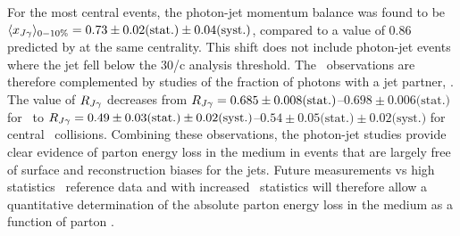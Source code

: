 For the most central events, the  photon-jet momentum balance  was found to be
$\langle x_{J\gamma}\rangle_{0-10\%} = 0.73 \pm 0.02 \mbox{(stat.)} \pm 0.04 \mbox{(syst.)}$, compared
to a value of 0.86 predicted by \PYTHYD{} at the same centrality. This shift does
not include photon-jet events where the jet fell below the 30\GeV/c analysis threshold. 
The \xjg\ observations are therefore complemented by studies of the fraction of 
photons with a jet partner, \rjg.  The value of $R_{J\gamma}$ decreases
from $R_{J\gamma} = 0.685\pm 0.008\mbox{(stat.)}$--$0.698\pm 0.006\mbox{(stat.)}$ for \PYTHYD\ 
to  $R_{J\gamma} = 0.49\pm 0.03\mbox{(stat.)}\pm 0.02\mbox{(syst.)}$--$0.54\pm 0.05\mbox{(stat.)}\pm 0.02\mbox{(syst.)}$ for
central \PbPb\ collisions. Combining these observations, the photon-jet studies 
provide clear evidence of parton energy loss in the medium in events that are 
largely free of surface and reconstruction biases for the jets. Future measurements 
vs high statistics \pp\ reference data and with increased \PbPb\ statistics will
therefore allow a quantitative determination of the absolute parton energy loss
in the medium as a function of parton \pT.

